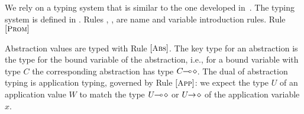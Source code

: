 %

\noi We rely on a typing system that is similar to the one developed in~\cite{tlca07,MostrousY15}. 
The typing system is defined in .
Rules , ,  are name and variable introduction rules. 
Rule ${\footnotesize[\textrm{\small \textsc{Prom}}]}$

Abstraction values are typed with Rule ${\footnotesize[\textrm{\small \textsc{Abs}}]}$.
The key type for an abstraction is the type for
the bound variable of the abstraction, i.e., for
a bound variable with type $C$ the corresponding abstraction has type $C\!\! \multimap\! \diamond$.
The dual of abstraction typing is application typing,
governed by Rule ${\footnotesize[\textrm{\small \textsc{App}}]}$: we expect
the type $U$ of an application value $W$ 
to match the type $U\!\! \multimap\! \diamond$ or $U\!\! \rightarrow\! \diamond$
of the application variable $x$.

